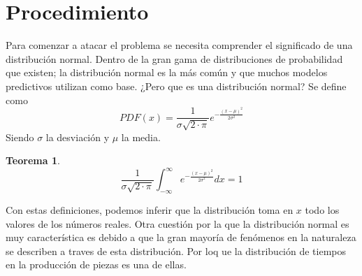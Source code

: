 \documentclass{article}
\newtheorem{teorema}{Teorema}
\begin{document}
\section{Procedimiento}
Para comenzar a atacar el problema se necesita comprender el significado de una distribución normal.
Dentro de la gran gama de distribuciones de probabilidad que existen; la distribución normal es la más común y que muchos modelos predictivos utilizan como base.
¿Pero que es una distribución normal?
Se define como 
\begin{equation}
    PDF(x)=\frac{1}{\sigma\sqrt{2\cdot\pi}}e^{-\frac{(x-\mu)^2}{2\sigma^2}}
\end{equation}
Siendo $\sigma$ la desviación y $\mu$ la media. 
\begin{teorema}
    \begin{equation}
        \frac{1}{\sigma\sqrt{2\cdot\pi}}\int_{-\infty}^{\infty}e^{-\frac{(x-\mu)^2}{2\sigma^2}} dx=1
    \end{equation}
\end{teorema}
Con estas definiciones, podemos inferir que la distribución toma en $x$ todo los valores de los números reales. Otra cuestión por la que la distribución normal es muy característica es debido a que la gran mayoría de fenómenos en la naturaleza se describen a traves de esta distribución. Por loq ue la distribución de tiempos en la producción de piezas es una de ellas.
\end{document}
